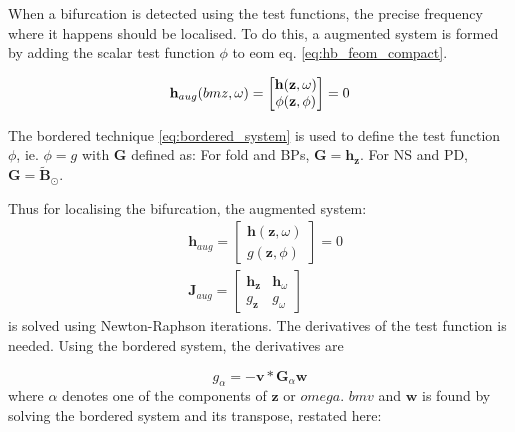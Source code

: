 When a bifurcation is detected using the test functions, the precise frequency
where it happens should be localised. To do this, a augmented system is formed
by adding the scalar test function $\phi$ to eom eq. \eqref{eq:hb_feom_compact}.

\begin{equation}
  \bm h_{aug}(\\bm z, \omega) =
  \begin{bmatrix}
    \bm h(\bm z, \omega) \\
    \phi(\bm z, \phi)
  \end{bmatrix}
  = 0
\end{equation}

The bordered technique \eqref{eq:bordered_system} is used to define the test
function $\phi$, ie. $\phi = g$ with $\bm G$ defined as: For fold and BPs, $\bm
G = \bm h_{\bm z}$. For NS and PD, $\bm G = \tilde{\bm B}_\odot$.

Thus for localising the bifurcation, the augmented system:
\begin{align}
  \label{eq:bif_aug}
  &\bm h_{aug} =
  \begin{bmatrix}
    \bm h(\bm z, \omega) \\
    g(\bm z, \phi)
  \end{bmatrix}
  = 0 \\
  &\bm J_{aug} =
  \begin{bmatrix}
    \bm h_{\bm z} & \bm h_{\omega} \\
    g_{\bm z} & g_{\omega}
  \end{bmatrix}
\end{align}
is solved using Newton-Raphson iterations. The derivatives of the test function
is needed. Using the bordered system, the derivatives are

\begin{equation}
  g_\alpha = -\bm v* \bm G_\alpha \bm w
\end{equation}
where $\alpha$ denotes one of the components of $\bm z$ or $omega$. $bm v$ and
$\bm w$ is found by solving the bordered system and its transpose, restated here:


